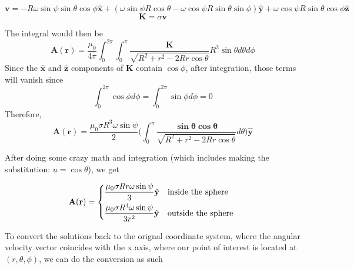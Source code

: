 \documentclass[12pt,a4paper]{extreport}
\numberwithin{equation}{chapter}
\let\oldhat\hat
\renewcommand{\hat}[1]{\oldhat{\mathbf{#1}}}
\begin{document}
    $$\mathbf{v}=-R\omega\sin\psi\sin\theta\cos\phi\hat{x}+(\omega\sin\psi R\cos\theta - \omega \cos \psi R \sin \theta \sin \phi)\hat{y}+\omega \cos \psi R \sin \theta\cos\phi \hat{z}$$
    $$\mathbf{K}=\sigma \mathbf{v}$$




    The integral would then be
    $$\mathbf{A(r)}=\frac{\mu_0}{4\pi}\int_0^{2\pi} \int_0^\pi\frac{\mathbf{K}}{\sqrt{R^2+r^2-2Rr\cos\theta}} R^2 \sin\theta d\theta d\phi$$
    Since the $\hat{x}$ and $\hat{z}$ components of $\mathbf{K}$ contain $\cos\phi$, after integration, those terms will vanish since
    $$\int_0^{2\pi}\cos\phi d\phi =\int_0^{2\pi}\sin\phi d\phi=0 $$
    Therefore, 
    $$\mathbf{A(r)}=\frac{\mu_0\sigma R^3 \omega \sin \psi}{2} \bigg(\int_0^\pi\frac{\mathbf{\sin\theta \cos\theta}}{\sqrt{R^2+r^2-2Rr\cos\theta}} d\theta \bigg) \hat{y}$$

    After doing some crazy math and integration (which includes making the substitution: $u=\cos\theta$), we get 

    $$\mathbf{A(r)} =
    \begin{dcases*}
    \frac{\mu_0\sigma Rr \omega \sin \psi}{3}\hat{y} & \text{inside the sphere}\\
    \frac{\mu_0\sigma R^4 \omega \sin \psi}{3 r^2}\hat{y} & \text{outside the sphere}
    \end{dcases*}$$

    To convert the solutions back to the orignal coordinate system, where the angular velocity vector coincides with the x axis, where our point of interest is located at $(r,\theta,\phi)$, we can do the conversion as such
\end{document}
